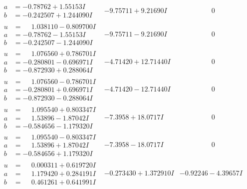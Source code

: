 \documentclass[1p]{elsarticle_modified}
\theoremstyle{definition}
\begin{document}
$$\begin{array}{c|c|c}
\begin{aligned}
a &= -0.78762 + 1.55153 I \\
b &= -0.242507 + 1.244090 I\end{aligned}
 & -9.75711 + 9.21690 I & \phantom{-0.000000 } 0 \\ \hline\begin{aligned}
u &= \phantom{-}1.038110 - 0.809700 I \\
a &= -0.78762 - 1.55153 I \\
b &= -0.242507 - 1.244090 I\end{aligned}
 & -9.75711 - 9.21690 I & \phantom{-0.000000 } 0 \\ \hline\begin{aligned}
u &= \phantom{-}1.076560 + 0.786701 I \\
a &= -0.280801 - 0.696971 I \\
b &= -0.872930 + 0.288064 I\end{aligned}
 & -4.71420 + 12.71440 I & \phantom{-0.000000 } 0 \\ \hline\begin{aligned}
u &= \phantom{-}1.076560 - 0.786701 I \\
a &= -0.280801 + 0.696971 I \\
b &= -0.872930 - 0.288064 I\end{aligned}
 & -4.71420 - 12.71440 I & \phantom{-0.000000 } 0 \\ \hline\begin{aligned}
u &= \phantom{-}1.095540 + 0.803347 I \\
a &= \phantom{-}1.53896 - 1.87042 I \\
b &= -0.584656 - 1.179320 I\end{aligned}
 & -7.3958 + 18.0717 I & \phantom{-0.000000 } 0 \\ \hline\begin{aligned}
u &= \phantom{-}1.095540 - 0.803347 I \\
a &= \phantom{-}1.53896 + 1.87042 I \\
b &= -0.584656 + 1.179320 I\end{aligned}
 & -7.3958 - 18.0717 I & \phantom{-0.000000 } 0 \\ \hline\begin{aligned}
u &= \phantom{-}0.000311 + 0.619720 I \\
a &= \phantom{-}1.179420 + 0.284191 I \\
b &= \phantom{-}0.461261 + 0.641991 I\end{aligned}
 & -0.273430 + 1.372910 I & -0.92246 - 4.39657 I \\ \hline\begin{aligned}

\end{aligned}
\end{array}$$
\end{document}
